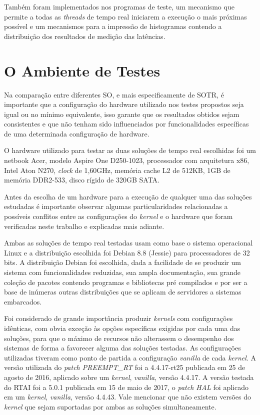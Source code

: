 Também foram implementados nos programas de teste, um mecanismo que permite a todas as \textit{threads} de tempo real iniciarem a execução o mais próximas possível e um mecanismos para a impressão de histogramas contendo a distribuição dos resultados de medição das latências.

\section{O Ambiente de Testes}
Na comparação entre diferentes SO, e mais especificamente de SOTR,  é importante que a configuração do hardware utilizado nos testes propostos seja igual ou no mínimo equivalente, isso garante que os resultados obtidos sejam consistentes e que não tenham sido influenciados por funcionalidades específicas de uma determinada configuração de hardware.

O hardware utilizado para testar as duas soluções de tempo real escolhidas foi um netbook Acer, modelo Aspire One D250-1023, processador com arquitetura x86, Intel Aton N270, \textit{clock} de 1,60GHz, memória cache L2 de 512KB, 1GB de memória DDR2-533, disco rígido de 320GB SATA.

Antes da escolha de um hardware para a execução de qualquer uma das soluções estudadas é importante observar algumas particularidades relacionadas a possíveis conflitos entre as configurações do \textit{kernel} e o hardware que foram verificadas neste trabalho e explicadas mais adiante. 

Ambas as soluções de tempo real testadas usam como base o sistema operacional Linux e a distribuição escolhida foi Debian 8.8 (Jessie) para processadores de 32 bits. A distribuição Debian foi escolhida, dada a facilidade de se produzir um sistema com funcionalidades reduzidas, sua ampla documentação, sua grande coleção de pacotes contendo programas e bibliotecas pré compilados e por ser a base de inúmeras outras distribuições que se aplicam de servidores a sistemas embarcados. 

Foi considerado de grande importância produzir \textit{kernels} com configurações idênticas, com obvia exceção às opções específicas exigidas por cada uma das soluções, para que o máximo de recursos não alterassem o desempenho dos sistemas de forma a favorecer alguma das soluções testadas. As configurações utilizadas tiveram como ponto de partida a configuração \textit{vanilla} de cada \textit{kernel}. A versão utilizada do \textit{patch PREEMPT\_RT} foi a 4.4.17-rt25 publicada em 25 de agosto de 2016, aplicado sobre um \textit{kernel}, \textit{vanilla}, versão 4.4.17. A versão testada do RTAI foi a 5.0.1 publicada em 15 de maio de 2017, o \textit{patch HAL} foi aplicado em um \textit{kernel}, \textit{vanilla}, versão 4.4.43. Vale mencionar que não existem versões do \textit{kernel} que sejam suportadas por ambas as soluções simultaneamente.

